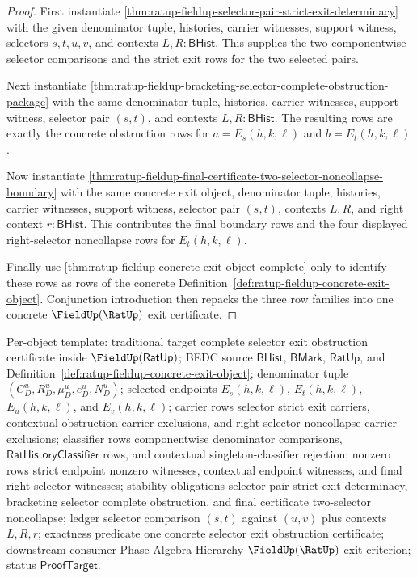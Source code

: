 \begin{proof}
First instantiate
\autoref{thm:ratup-fieldup-selector-pair-strict-exit-determinacy} with the
given denominator tuple, histories, carrier witnesses, support witness,
selectors $s,t,u,v$, and contexts $L,R:\mathsf{BHist}$. This supplies the two
componentwise selector comparisons and the strict exit rows for the two selected
pairs.

Next instantiate
\autoref{thm:ratup-fieldup-bracketing-selector-complete-obstruction-package}
with the same denominator tuple, histories, carrier witnesses, support witness,
selector pair $(s,t)$, and contexts $L,R:\mathsf{BHist}$. The resulting rows
are exactly the concrete obstruction rows for
$a=E_s(h,k,\ell)$ and $b=E_t(h,k,\ell)$.

Now instantiate
\autoref{thm:ratup-fieldup-final-certificate-two-selector-noncollapse-boundary}
with the same concrete exit object, denominator tuple, histories, carrier
witnesses, support witness, selector pair $(s,t)$, contexts $L,R$, and right
context $r:\mathsf{BHist}$. This contributes the final boundary rows and the
four displayed right-selector noncollapse rows for $E_t(h,k,\ell)$.

Finally use \autoref{thm:ratup-fieldup-concrete-exit-object-complete} only to
identify these rows as rows of the concrete
Definition~\ref{def:ratup-fieldup-concrete-exit-object}. Conjunction
introduction then repacks the three row families into one concrete
$\FieldUp(\RatUp)$ exit certificate.
\end{proof}

Per-object template: traditional target complete selector exit obstruction
certificate inside $\FieldUp(\mathsf{RatUp})$; BEDC source $\mathsf{BHist}$,
$\mathsf{BMark}$, $\mathsf{RatUp}$, and
Definition~\ref{def:ratup-fieldup-concrete-exit-object}; denominator tuple
$(C_D^u,R_D^u,\mu_D^u,e_D^u,N_D^u)$; selected endpoints
$E_s(h,k,\ell)$, $E_t(h,k,\ell)$, $E_u(h,k,\ell)$, and $E_v(h,k,\ell)$;
carrier rows selector strict exit carriers, contextual obstruction carrier
exclusions, and right-selector noncollapse carrier exclusions; classifier rows
componentwise denominator comparisons, $\mathsf{RatHistoryClassifier}$ rows,
and contextual singleton-classifier rejection; nonzero rows strict endpoint
nonzero witnesses, contextual endpoint witnesses, and final right-selector
witnesses; stability obligations selector-pair strict exit determinacy,
bracketing selector complete obstruction, and final certificate two-selector
noncollapse; ledger selector comparison $(s,t)$ against $(u,v)$ plus contexts
$L,R,r$; exactness predicate one concrete selector exit obstruction certificate;
downstream consumer Phase Algebra Hierarchy $\FieldUp(\RatUp)$ exit criterion;
status $\mathsf{ProofTarget}$.


